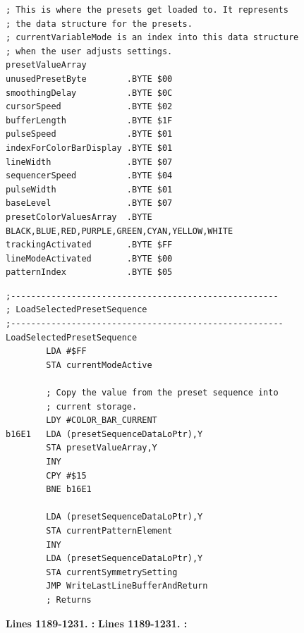 \clearpage
\begin{lstlisting}
; This is where the presets get loaded to. It represents
; the data structure for the presets.
; currentVariableMode is an index into this data structure
; when the user adjusts settings.
presetValueArray
unusedPresetByte        .BYTE $00
smoothingDelay          .BYTE $0C
cursorSpeed             .BYTE $02
bufferLength            .BYTE $1F
pulseSpeed              .BYTE $01
indexForColorBarDisplay .BYTE $01
lineWidth               .BYTE $07
sequencerSpeed          .BYTE $04
pulseWidth              .BYTE $01
baseLevel               .BYTE $07
presetColorValuesArray  .BYTE BLACK,BLUE,RED,PURPLE,GREEN,CYAN,YELLOW,WHITE
trackingActivated       .BYTE $FF
lineModeActivated       .BYTE $00
patternIndex            .BYTE $05
\end{lstlisting}
\begin{lstlisting}
;-----------------------------------------------------
; LoadSelectedPresetSequence
;------------------------------------------------------
LoadSelectedPresetSequence    
        LDA #$FF
        STA currentModeActive

        ; Copy the value from the preset sequence into 
        ; current storage.
        LDY #COLOR_BAR_CURRENT
b16E1   LDA (presetSequenceDataLoPtr),Y
        STA presetValueArray,Y
        INY 
        CPY #$15
        BNE b16E1

        LDA (presetSequenceDataLoPtr),Y
        STA currentPatternElement
        INY 
        LDA (presetSequenceDataLoPtr),Y
        STA currentSymmetrySetting
        JMP WriteLastLineBufferAndReturn
        ; Returns
\end{lstlisting}
\clearpage

\textbf{Lines 1189-1231. :} 
\textbf{Lines 1189-1231. :} 
\clearpage


